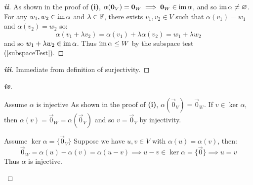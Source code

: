 \documentclass[../main.tex]{subfiles}
\begin{document}
\begin{proof}[\textbf{ii}]
  As shown in the proof of \textbf{(i)}, $\alpha(\mathbf{\bm{0}}_{V}) = \mathbf{\bm{0}}_{W} \implies \mathbf{\bm{0}}_{W} \in \operatorname{im} \alpha$, and so $\operatorname{im} \alpha \neq \varnothing$.
  For any $w_1, w_2 \in \operatorname{im} \alpha$ and $\lambda \in \mathbb{F}$, there exists $v_1, v_2 \in V$ such that $\alpha(v_1) = w_1$ and $\alpha(v_2) = w_2$ so:
  \[
    \alpha(v_1 + \lambda v_2) = \alpha(v_1) + \lambda \alpha(v_2) = w_1 + \lambda w_2
  \]
  and so $w_1 + \lambda w_2 \in \operatorname{im} \alpha$.
  Thus $\operatorname{im} \alpha \leq W$ by the subspace test (\cref{subspaceTest}).
\end{proof}
\begin{proof}[\textbf{iii}]
  Immediate from definition of surjectivity.
\end{proof}
\begin{proof}[\textbf{iv}]
  \begin{proofdirection}{Assume $\alpha$ is injective}
    As shown in the proof of \textbf{(i)}, $\alpha(\vec{0}_{V}) = \vec{0}_{W}$.
    If $v \in \ker \alpha$, then $\alpha(v) = \vec{0}_{W} = \alpha(\vec{0}_{V})$ and so $v = \vec{0}_{V}$ by injectivity.
  \end{proofdirection}
  \begin{proofdirection}{Assume $\ker \alpha = \{\vec{0}_{V}\}$}
    Suppose we have $u, v \in V$ with $\alpha(u) = \alpha(v)$, then:
    \[
      \vec{0}_{W} = \alpha(u) - \alpha(v) = \alpha(u - v) \implies u - v \in \ker \alpha = \{\vec{0}\} \implies u = v
    \]
    Thus $\alpha$ is injective.
  \end{proofdirection}
\end{proof}
\end{document}
